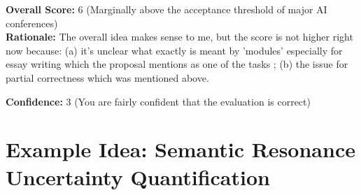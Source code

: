 \begin{tcolorbox}[colback=green!10!white, colframe=green!80!black, title=\textbf{Reviewer 2}]
\vspace{10pt}

\textbf{Overall Score:} 6 (Marginally above the acceptance threshold of major AI conferences)\\
\textbf{Rationale:} The overall idea makes sense to me, but the score is not higher right now because: (a) it's unclear what exactly is meant by 'modules' especially for essay writing which the proposal mentions as one of the tasks ; (b) the issue for partial correctness which was mentioned above.

\vspace{10pt}

\textbf{Confidence:} 3 (You are fairly confident that the evaluation is correct)
\end{tcolorbox}


\newpage 



\section{Example Idea: Semantic Resonance Uncertainty Quantification}
\label{sec:example_2}



